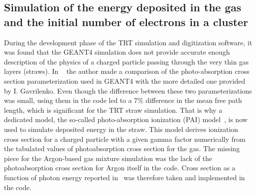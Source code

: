 \subsection{Simulation of the energy deposited in the gas and the initial number of electrons in a cluster}
\label{subsec:pai_model}
During the development phase of the TRT simulation and digitization software, it was found that the GEANT4 simulation does not provide accurate enough description of the physics
of a charged particle passing through the very thin gas layers (straws). 
In ~\cite{kittelmann_thesis} the author made a comparison of the photo-absorption cross section parameterization used in GEANT4 with the more detailed one provided by I. Gavrilenko.
Even though the difference between these two parameterizations was small, using them in the code led to a 7$\%$ difference in the mean free path length, which is significant for the TRT straw simulation.
That is why a dedicated model, the so-called photo-absorption ionization (PAI) model~\cite{pai_model_paper}, is now used to simulate deposited energy in the straw.
This model derives ionization cross section for a charged particle with a given gamma factor numerically from the tabulated values of photoabsorption cross section for the gas.
The missing piece for the Argon-based gas mixture simulation was the lack of the photoabsorption cross section for Argon itself in the code.
Cross section as a function of photon energy reported in~\cite{argon_cross_section} was therefore taken and implemented in the code.

